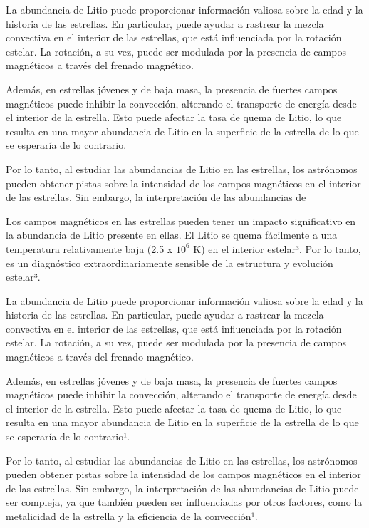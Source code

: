 La abundancia de Litio puede proporcionar información valiosa sobre la edad y la historia de las estrellas. En particular, puede ayudar a rastrear la mezcla convectiva en el interior de las estrellas, que está influenciada por la rotación estelar. La rotación, a su vez, puede ser modulada por la presencia de campos magnéticos a través del frenado magnético.

Además, en estrellas jóvenes y de baja masa, la presencia de fuertes campos magnéticos puede inhibir la convección, alterando el transporte de energía desde el interior de la estrella. Esto puede afectar la tasa de quema de Litio, lo que resulta en una mayor abundancia de Litio en la superficie de la estrella de lo que se esperaría de lo contrario.

Por lo tanto, al estudiar las abundancias de Litio en las estrellas, los astrónomos pueden obtener pistas sobre la intensidad de los campos magnéticos en el interior de las estrellas. Sin embargo, la interpretación de las abundancias de

Los campos magnéticos en las estrellas pueden tener un impacto significativo en la abundancia de Litio presente en ellas. El Litio se quema fácilmente a una temperatura relativamente baja (2.5 x $10^6$ K) en el interior estelar³. Por lo tanto, es un diagnóstico extraordinariamente sensible de la estructura y evolución estelar³.

La abundancia de Litio puede proporcionar información valiosa sobre la edad y la historia de las estrellas. En particular, puede ayudar a rastrear la mezcla convectiva en el interior de las estrellas, que está influenciada por la rotación estelar. La rotación, a su vez, puede ser modulada por la presencia de campos magnéticos a través del frenado magnético.

Además, en estrellas jóvenes y de baja masa, la presencia de fuertes campos magnéticos puede inhibir la convección, alterando el transporte de energía desde el interior de la estrella. Esto puede afectar la tasa de quema de Litio, lo que resulta en una mayor abundancia de Litio en la superficie de la estrella de lo que se esperaría de lo contrario¹.

Por lo tanto, al estudiar las abundancias de Litio en las estrellas, los astrónomos pueden obtener pistas sobre la intensidad de los campos magnéticos en el interior de las estrellas. Sin embargo, la interpretación de las abundancias de Litio puede ser compleja, ya que también pueden ser influenciadas por otros factores, como la metalicidad de la estrella y la eficiencia de la convección¹.

